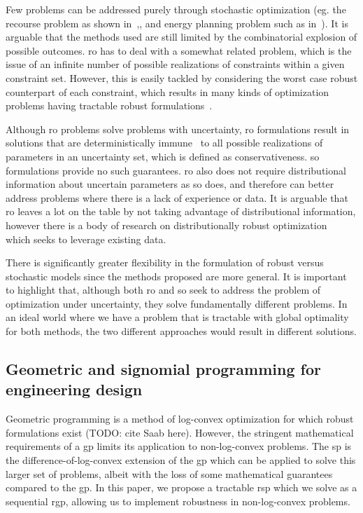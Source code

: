 Few problems can be addressed purely through stochastic optimization (eg. the recourse problem as
shown in~\cite{Kall1982},\cite{Higle1991}, and energy planning problem such as in~\cite{Pereira1991}).
It is arguable that the methods used are still limited by the combinatorial
explosion of possible outcomes. \gls{ro} has to deal with a somewhat related problem, which is the issue of an infinite number
of possible realizations of constraints within a given constraint set. However, this is easily
tackled by considering the worst case robust counterpart of each constraint, which
results in many kinds of optimization problems having tractable robust formulations~\cite{Bertsimas2011}.

Although \gls{ro} problems solve problems with uncertainty,
\gls{ro} formulations result in solutions that are deterministically immune~\cite{Bertsimas2011}
to all possible realizations of parameters in an uncertainty set, which is defined as conservativeness.
\gls{so} formulations
provide no such guarantees. \gls{ro} also does not require distributional information
about uncertain parameters as \gls{so} does, and therefore can better address problems where there
is a lack of experience or data. It is arguable that \gls{ro}
leaves a lot on the table by not taking advantage of distributional information,
however there is a body of research on distributionally robust optimization~\cite{Bertsimas2013}
which seeks to leverage existing data.

There is significantly greater flexibility in the formulation of robust versus stochastic models
since the methods proposed are more general. It is important to highlight that,
although both \gls{ro} and \gls{so} seek to address the problem
of optimization under uncertainty, they solve fundamentally different problems. In an ideal world where
we have a problem that is tractable with global optimality for both methods, the two different
approaches would result in different solutions.

\subsection{Geometric and signomial programming for engineering design}

Geometric programming is a method of log-convex optimization for which robust formulations exist
(TODO: cite Saab here).
However, the stringent mathematical requirements of a \gls{gp} limits its application to non-log-convex problems.
The \gls{sp} is the difference-of-log-convex extension of the \gls{gp} which can be applied to
solve this larger set of problems, albeit with the loss of some mathematical guarantees compared to the \gls{gp}.
In this paper, we propose a tractable \gls{rsp} which we solve as a sequential \gls{rgp},
allowing us to implement robustness in non-log-convex problems.

